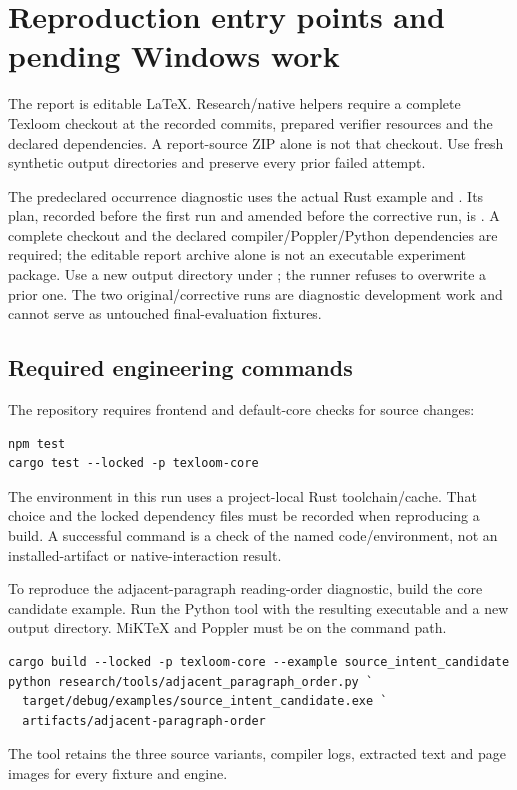 \section{Reproduction entry points and pending Windows work}
\label{app:reproduction}
The report is editable LaTeX. Research/native helpers require a complete
Texloom checkout at the recorded commits, prepared verifier resources and the
declared dependencies. A report-source ZIP alone is not that checkout. Use
fresh synthetic output directories and preserve every prior failed attempt.

The predeclared occurrence diagnostic uses the actual Rust
 example and
. Its plan, recorded before
the first run and amended before the corrective run, is
. A complete checkout and the
declared compiler/Poppler/Python dependencies are required; the editable report
archive alone is not an executable experiment package. Use a new output directory
under ; the runner refuses to overwrite a prior one. The two
original/corrective runs are diagnostic development work and cannot serve as
untouched final-evaluation fixtures.

\subsection{Required engineering commands}
The repository requires frontend and default-core checks for source changes:
\begin{verbatim}
npm test
cargo test --locked -p texloom-core
\end{verbatim}
The environment in this run uses a project-local Rust toolchain/cache. That
choice and the locked dependency files must be recorded when reproducing a
build. A successful command is a check of the named code/environment, not an
installed-artifact or native-interaction result.

To reproduce the adjacent-paragraph reading-order diagnostic, build the
core candidate example. Run the Python tool with the resulting executable
and a new output directory. MiKTeX and Poppler must be on the command path.
\begin{verbatim}
cargo build --locked -p texloom-core --example source_intent_candidate
python research/tools/adjacent_paragraph_order.py `
  target/debug/examples/source_intent_candidate.exe `
  artifacts/adjacent-paragraph-order
\end{verbatim}
The tool retains the three source variants, compiler logs, extracted text
and page images for every fixture and engine.

